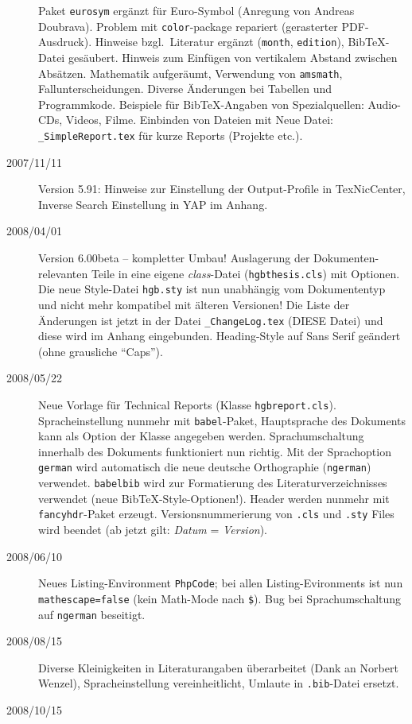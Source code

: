\begin{sloppypar}
\begin{description}
Paket \texttt{eurosym} ergänzt für Euro-Symbol (Anregung von Andreas 
Doubrava).
Problem mit \texttt{color}-package repariert (gerasterter PDF-Ausdruck).
Hinweise bzgl.\ Literatur ergänzt (\texttt{month}, \texttt{edition}),
BibTeX-Datei gesäubert.
Hinweis zum Einfügen von vertikalem Abstand zwischen Absätzen.
Mathematik aufgeräumt, Verwendung von \texttt{amsmath}, 
Fallunterscheidungen.
Diverse Änderungen bei Tabellen und Programmkode.
Beispiele für BibTeX-Angaben von Spezialquellen: Audio-CDs, 
Videos, Filme. Einbinden von Dateien mit \verb!!
Neue Datei: \verb!_SimpleReport.tex! für kurze Reports (Projekte etc.).
%
\item[2007/11/11]
Version 5.91: Hinweise zur Einstellung der Output-Profile in
TexNicCenter, Inverse Search Einstellung in YAP im Anhang.
%
\item[2008/04/01]
Version 6.00beta -- kompletter Umbau!
Auslagerung der Doku\-menten-relevanten Teile in eine eigene 
\emph{class}-Datei (\texttt{hgbthesis.cls}) mit Optionen.
Die neue Style-Datei \texttt{hgb.sty} ist nun unabhängig vom 
Dokumententyp und nicht mehr kompatibel mit älteren Versionen!
Die Liste der Änderungen ist jetzt in der Datei \verb!_ChangeLog.tex!
(DIESE Datei) und diese wird im Anhang eingebunden.
Heading-Style auf Sans Serif geändert (ohne grausliche "`Caps"').
%
\item[2008/05/22]
Neue Vorlage für Technical Reports (Klasse \texttt{hgbreport.cls}).
Spracheinstellung nunmehr mit \texttt{babel}-Paket, Hauptsprache
des Dokuments kann als Option der Klasse angegeben werden.
Sprachumschaltung innerhalb des Dokuments funktioniert nun
richtig. Mit der Sprachoption \texttt{german} wird automatisch die neue deutsche 
Orthographie (\texttt{ngerman}) verwendet.
\texttt{babelbib} wird zur Formatierung des Literaturverzeichnisses
verwendet (neue BibTeX-Style-Optionen!).
Header werden nunmehr mit \texttt{fancyhdr}-Paket erzeugt.
Versionsnummerierung von \texttt{.cls} und \texttt{.sty} Files wird beendet 
(ab jetzt gilt: \emph{Datum} = \emph{Version}). 
%
\item[2008/06/10]
Neues Listing-Environment \texttt{PhpCode}; bei allen Listing-Eviron\-ments ist nun 
\texttt{mathescape=false} (kein Math-Mode nach \verb!$!). 
Bug bei Sprachumschaltung auf \texttt{ngerman} beseitigt.
%
\item[2008/08/15]
Diverse Kleinigkeiten in Literaturangaben überarbeitet (Dank an Norbert Wenzel), Spracheinstellung vereinheitlicht, Umlaute in \texttt{.bib}-Datei ersetzt.
%
\item[2008/10/15] 

\end{description}
\end{sloppypar}
